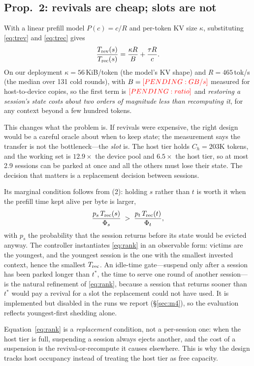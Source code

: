 \subsection{Prop.~2: revivals are cheap; slots are not}

With a linear prefill model $P(c)=c/R$ and per-token KV size $\kappa$, substituting
\eqref{eq:trev} and \eqref{eq:trec} gives
\begin{equation}
\frac{T_{\mathrm{rev}}(s)}{T_{\mathrm{rec}}(s)}
=\frac{\kappa R}{B}+\frac{\tau R}{c}.
\label{eq:ratio}
\end{equation}
On our deployment $\kappa=56$\,KiB/token (the model's KV shape) and $R=465$\,tok/s (the
median over 131 cold rounds), with $B=\textcolor{red}{[PENDING: GB/s]}$ measured for host-to-device copies, so
the first term is $\textcolor{red}{[PENDING: ratio]}$ and \emph{restoring a session's state costs about two orders of magnitude
less than recomputing it}, for any context beyond a few hundred tokens.

This changes what the problem is. If revivals were expensive, the right design would be a
careful oracle about when to keep state; the measurement says the transfer is not the
bottleneck---the \emph{slot} is. The host tier holds $C_h=203$K tokens, and
the working set is $12.9\times$ the device pool and $6.5\times$ the host tier,
so at most 2.9 sessions can be parked at once and all the others must lose
their state. The decision that matters is a replacement decision between sessions.

Its marginal condition follows from (2): holding $s$ rather than $t$ is worth it when the
prefill time kept alive per byte is larger,
\begin{equation}
\frac{p_s\,T_{\mathrm{rec}}(s)}{\Phi_s}\;>\;\frac{p_t\,T_{\mathrm{rec}}(t)}{\Phi_t},
\label{eq:rank}
\end{equation}
with $p_s$ the probability that the session returns before its state would be evicted
anyway. The controller instantiates \eqref{eq:rank} in an observable form: victims are the
youngest, and the youngest session is the one with the smallest invested context, hence the
smallest $T_{\mathrm{rec}}$. An idle-time gate---suspend only after a session has been parked longer
than $t^\ast$, the time to serve one round of another session---is the natural refinement
of \eqref{eq:rank}, because a session that returns sooner than $t^\ast$ would pay a revival
for a slot the replacement could not have used. It is implemented but disabled in the runs
we report (\S\ref{sec:m4}), so the evaluation reflects youngest-first shedding alone.

Equation~\eqref{eq:rank} is a \emph{replacement} condition, not a per-session one: when the
host tier is full, suspending a session always ejects another, and the cost of a
suspension is the revival-or-recompute it causes elsewhere. This is why the design tracks
host occupancy instead of treating the host tier as free capacity.

